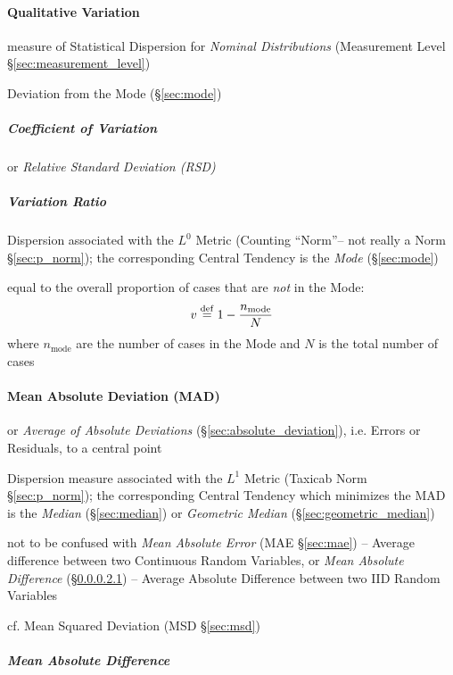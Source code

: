 \paragraph{Qualitative Variation}\label{sec:qualitative_variation}\hfill

measure of Statistical Dispersion for \emph{Nominal Distributions}
(Measurement Level \S\ref{sec:measurement_level})

Deviation from the Mode (\S\ref{sec:mode})



\subparagraph{Coefficient of Variation}\label{sec:variation_coefficient}\hfill

or \emph{Relative Standard Deviation (RSD)}



\subparagraph{Variation Ratio}\label{sec:variation_ratio}\hfill

Dispersion associated with the $L^0$ Metric (Counting ``Norm''-- not really a
Norm \S\ref{sec:p_norm}); the corresponding Central Tendency is the \emph{Mode}
(\S\ref{sec:mode})

equal to the overall proportion of cases that are \emph{not} in the Mode:
\[
  v \stackrel{\mathrm{def}}= 1 - \frac{n_{\text{mode}}}{N}
\]
where $n_{\text{mode}}$ are the number of cases in the Mode and $N$ is the total
number of cases



\paragraph{Mean Absolute Deviation (MAD)}\label{sec:mad}\hfill

or \emph{Average of Absolute Deviations} (\S\ref{sec:absolute_deviation}), i.e.
Errors or Residuals, to a central point

Dispersion measure associated with the $L^1$ Metric (Taxicab Norm
\S\ref{sec:p_norm}); the corresponding Central Tendency which minimizes the MAD
is the \emph{Median} (\S\ref{sec:median}) or \emph{Geometric Median}
(\S\ref{sec:geometric_median})

\fist not to be confused with \emph{Mean Absolute Error} (MAE \S\ref{sec:mae})
-- Average difference between two Continuous Random Variables,
or \emph{Mean Absolute Difference} (\S\ref{sec:mean_absolute_difference}) --
Average Absolute Difference between two IID Random Variables

cf. Mean Squared Deviation (MSD \S\ref{sec:msd})



\subparagraph{Mean Absolute Difference}
\label{sec:mean_absolute_difference}\hfill

